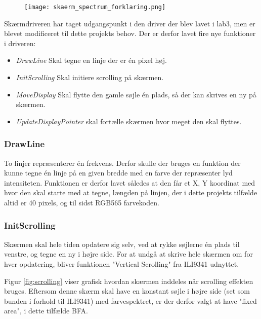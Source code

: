\begin{figure} [H]
	\centering
	\texttt{[image: skaerm\_spectrum\_forklaring.png]}
	\label{fig:skaerm_spectrum_forklaring}
\end{figure}

Skærmdriveren har taget udgangspunkt i den driver der blev lavet i lab3, men er blevet modificeret til dette projekts behov. 
Der er derfor lavet fire nye funktioner i driveren:
\begin{itemize}
	\item \textit{DrawLine} Skal tegne en linje der er én pixel høj.
	\item \textit{InitScrolling} Skal initiere scrolling på skærmen.
	\item \textit{MoveDisplay} Skal flytte den gamle søjle én plads, så der kan skrives en ny på skærmen.
	\item \textit{UpdateDisplayPointer} skal fortælle skærmen hvor meget den skal flyttes.
\end{itemize}

\subsubsection{DrawLine}
To linjer repræsenterer én frekvens. Derfor skulle der bruges en funktion der kunne tegne én linje på en given bredde med en farve der repræsenter lyd intensiteten.
Funktionen er derfor lavet således at den får et X, Y koordinat med hvor den skal starte med at tegne, længden på linjen, der i dette projekts tilfælde altid er 40 pixels, og til sidst RGB565 farvekoden.

\subsubsection{InitScrolling}
Skærmen skal hele tiden opdatere sig selv, ved at rykke søjlerne én plads til venstre, og tegne en ny i højre side. For at undgå at skrive hele skærmen om for hver opdatering, bliver funktionen "Vertical Scrolling" fra ILI9341 udnyttet.

Figur \ref{fig:scrolling} viser grafisk hvordan skærmen inddeles når scrolling effekten bruges. Eftersom denne skærm skal have en konstant søjle i højre side (set som bunden i forhold til ILI9341) med farvespektret, er der derfor valgt at have "fixed area", i dette tilfælde BFA.

